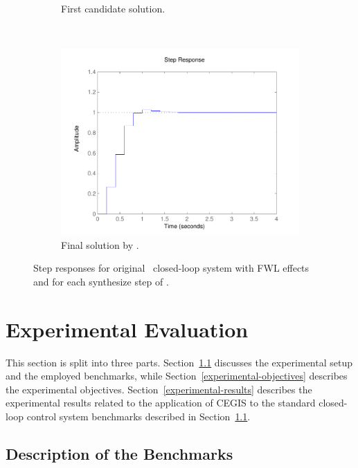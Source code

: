 \documentclass{sig-alternate-05-2015}
\begin{document}
\begin{figure}
\begin{subfigure}[b]{0.3\textwidth}
        \caption{First candidate solution.}
        \label{fig:step1}
    \end{subfigure}
    ~
    \begin{subfigure}[b]{0.3\textwidth}
        \includegraphics[width=\textwidth]{figures/runningexample_step2.pdf}
        \caption{Final solution by \tool.}
        \label{fig:step2}
    \end{subfigure}
    \caption{Step responses for original~\cite{DBLP:conf/hybrid/WangGRJF16} closed-loop system with FWL effects and for each {\sc synthesize} step of \tool.}\label{fig:step}
\end{figure}

\section{Experimental Evaluation}\label{sec:experiments}

This section is split into three parts. Section~\ref{experimental-setup}
discusses the experimental setup and the employed benchmarks, while
Section~\ref{experimental-objectives} describes the experimental objectives. 
Section~\ref{experimental-results} describes the experimental results
related to the application of CEGIS to the standard closed-loop control
system benchmarks described in Section~\ref{experimental-setup}.

\subsection{Description of the Benchmarks}
\label{experimental-setup}
\end{document}
